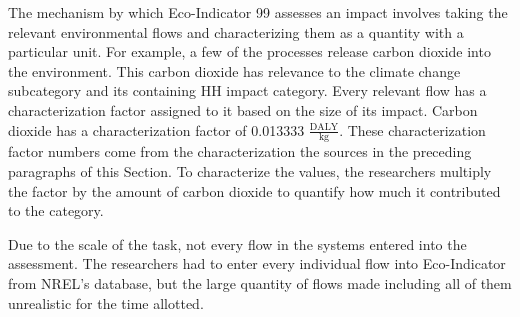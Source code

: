 \documentclass[final,journal,10pt,letterpaper,oneside,twocolumn,compsoc]%
{IEEEtran}
\begin{document}
The mechanism by which Eco-Indicator 99 assesses an impact involves taking the
relevant environmental flows and characterizing them as a quantity with a
particular unit. For
example, a few of the processes release carbon dioxide into the environment.
This carbon dioxide has relevance to the
climate change subcategory and its containing HH impact category.
Every relevant flow has a
characterization factor assigned to it based on the size of its impact. Carbon dioxide has
a characterization factor of 0.013333 $\frac{\textrm{DALY}}{\textrm{kg}}$.
These
characterization factor numbers come from the characterization the sources in
the preceding paragraphs of this Section.
To characterize the values, the researchers multiply the factor by the amount
of carbon dioxide to quantify how much it contributed to the category. 

Due to the scale of the task, not every flow in the systems entered into the
assessment. The researchers had to enter every individual flow into
Eco-Indicator from NREL's database, but the large quantity of flows made
including all of them unrealistic for the time allotted.
\end{document}
